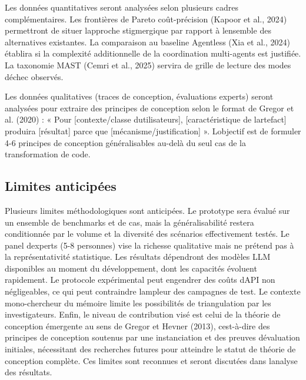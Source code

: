 \documentclass[12pt,a4paper]{article}
\begin{document}
Les données quantitatives seront analysées selon plusieurs cadres
complémentaires. Les frontières de Pareto coût-précision (Kapoor et al.,
2024) permettront de situer l\textquotesingle approche stigmergique par
rapport à l\textquotesingle ensemble des alternatives existantes. La
comparaison au baseline Agentless (Xia et al., 2024) établira si la
complexité additionnelle de la coordination multi-agents est justifiée.
La taxonomie MAST (Cemri et al., 2025) servira de grille de lecture
des modes d\textquotesingle échec observés.

Les données qualitatives (traces de conception, évaluations experts)
seront analysées pour extraire des principes de conception selon le
format de Gregor et al. (2020) : « Pour [contexte/classe
d\textquotesingle utilisateurs], [caractéristique de
l\textquotesingle artefact] produira [résultat] parce que
[mécanisme/justification] ». L\textquotesingle objectif est de formuler
4-6 principes de conception généralisables au-delà du seul cas de la
transformation de code.

\subsection{Limites anticipées}\label{limites-anticipuxe9es}

Plusieurs limites méthodologiques sont anticipées. Le prototype sera
évalué sur un ensemble de benchmarks et de cas, mais la
généralisabilité restera conditionnée par le volume et la diversité des
scénarios effectivement testés. Le panel d\textquotesingle experts
(5-8 personnes) vise la richesse qualitative mais ne prétend pas à la
représentativité statistique. Les résultats dépendront des modèles LLM
disponibles au moment du développement, dont les capacités évoluent
rapidement. Le protocole expérimental peut engendrer des coûts
d\textquotesingle API non négligeables, ce qui peut contraindre
l\textquotesingle ampleur des campagnes de test. Le contexte
mono-chercheur du mémoire limite les possibilités de triangulation par
les investigateurs. Enfin, le niveau de contribution visé est celui de
la théorie de conception émergente au sens de Gregor et Hevner (2013), c\textquotesingle est-à-dire
des principes de conception soutenus par une instanciation et des
preuves d\textquotesingle évaluation initiales, nécessitant des
recherches futures pour atteindre le statut de théorie de conception
complète. Ces limites sont reconnues et seront discutées dans
l\textquotesingle analyse des résultats.

\newpage
\end{document}
